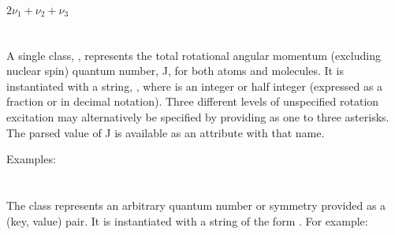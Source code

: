 \documentclass[letterpaper,10pt,english]{sphinxmanual}
\begin{document}
$2\nu_{1} + \nu_{2} + \nu_{3}$


\section{}
\label{\detokenize{states:rotationalstate}}
A single class, , represents the total rotational angular momentum (excluding nuclear spin) quantum number, J, for both atoms and molecules. It is instantiated with a string, , where  is an integer or half integer (expressed as a fraction or in decimal notation). Three different levels of unspecified rotation excitation may alternatively be specified by providing  as one to three asterisks. The parsed value of J is available as an attribute with that name.

Examples:

\begin{sphinxVerbatim}[commandchars=\\\{\}]
 \PYG{p}{[}\PYG{p}{]}    
 \PYG{p}{[}\PYG{p}{]}   
 \PYG{p}{[}\PYG{p}{]}   
 \PYG{p}{[}\PYG{p}{]}   
 \PYG{p}{[}\PYG{p}{]}   
 \PYG{p}{[}\PYG{p}{]} 
\end{sphinxVerbatim}


\section{}
\label{\detokenize{states:keyvaluepair}}
The  class represents an arbitrary quantum number or symmetry provided as a (key, value) pair. It is instantiated with a string of the form . For example:
\end{document}
